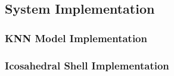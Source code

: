 \subsection{System Implementation}

\subsubsection{KNN Model Implementation}

\subsubsection{Icosahedral Shell Implementation}
\label{sec:icos_construction}